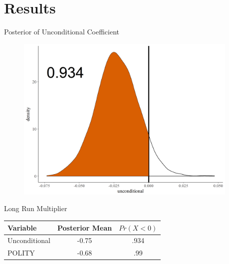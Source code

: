 \documentclass{beamer}
\begin{document}
\section{Results}


\begin{frame}{Posterior of Unconditional Coefficient} 


\begin{figure}
	\centering
		\includegraphics[width=0.95\textwidth]{uncond post_prob.png}
	\label{fig:uncond post_prob}
\end{figure}



\end{frame}


\begin{frame}[standout]{Long Run Multiplier} 

\begin{tabular}{lcc}
Variable & Posterior Mean & $Pr(X < 0)$ \\
\hline
Unconditional & -0.75 & .934 \\
\pause
POLITY & -0.68 & .99  \\
\end{tabular}

 \end{frame}




\end{document}
